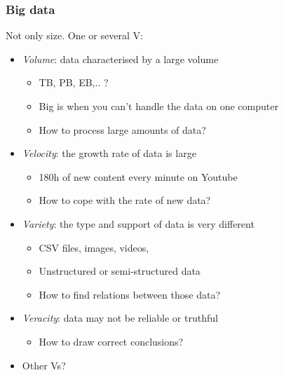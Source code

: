 \begin{frame}
  \frametitle{Big data}

  \begin{block}{Not only size.}
    One or several V:
    \begin{itemize}
    \item<2-> \emph{Volume}: data characterised by a large volume
      \begin{itemize}
      \item TB, PB, EB,.. ?
      \item Big is when you can't handle the data on one computer
      \item How to process large amounts of data?
      \end{itemize}
    \item<3-> \emph{Velocity}: the growth rate of data is large
      \begin{itemize}
      \item 180h of new content every minute on Youtube
      \item How to cope with the rate of new data?
      \end{itemize}
    \item<4-> \emph{Variety}: the type and support of data is very different
      \begin{itemize}
      \item CSV files, images, videos, \etc{}
      \item Unstructured or semi-structured data
      \item How to find relations between those data?
      \end{itemize}
    \item<5-> \emph{Veracity}: data may not be reliable or truthful
      \begin{itemize}
      \item How to draw correct conclusions?
      \end{itemize}
    \item<6-> Other Vs?
    \end{itemize}
  \end{block}
\end{frame}


